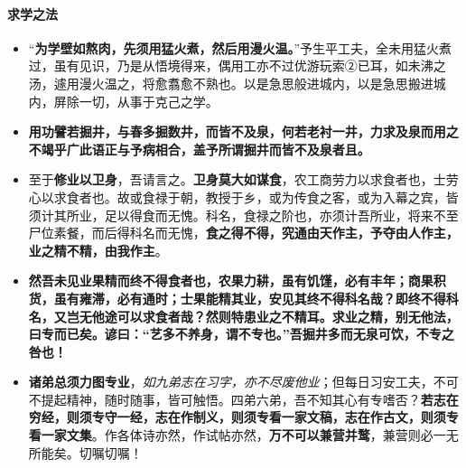 \documentclass[UTF8,a4paper,8pt]{ctexbook}
\begin{document}
	\paragraph{求学之法}
		\begin{itemize}
			\item “\textbf{为学壁如熬肉，先须用猛火煮，然后用漫火温。}”予生平工夫，全未用猛火煮过，虽有见识，乃是从悟境得来，偶用工亦不过优游玩索②已耳，如未沸之汤，遽用漫火温之，将愈翥愈不熟也。以是急思般进城内，以是急思搬进城内，屏除一切，从事于克己之学。
			
			\item \textbf{用功譬若掘井，与春多掘数井，而皆不及泉，何若老衬一井，力求及泉而用之不竭乎广此语正与予病相合，盖予所谓掘井而皆不及泉者且。}
			
			\item 至于\textbf{修业以卫身}，吾请言之。\textbf{卫身莫大如谋食}，农工商劳力以求食者也，士劳心以求食者也。故或食禄于朝，教授于乡，或为传食之客，或为入幕之宾，皆须计其所业，足以得食而无愧。科名，食禄之阶也，亦须计吾所业，将来不至尸位素餐，而后得科名而无愧，\textbf{食之得不得，究通由天作主，予夺由人作主，业之精不精，由我作主}。
			
			\item \textbf{然吾未见业果精而终不得食者也，农果力耕，虽有饥馑，必有丰年；商果积货，虽有雍滞，必有通时；士果能精其业，安见其终不得科名哉？即终不得科名，又岂无他途可以求食者哉？然则特患业之不精耳。求业之精，别无他法，曰专而已矣。谚曰：“艺多不养身，谓不专也。”吾掘井多而无泉可饮，不专之咎也！}
			
			\item \textbf{诸弟总须力图专业}，\textit{如九弟志在习字，亦不尽废他业}；但每日习安工夫，不可不提起精神，随时随事，皆可触悟。四弟六弟，吾不知其心有专嗜否？\textbf{若志在穷经，则须专守一经，志在作制义，则须专看一家文稿，志在作古文，则须专看一家文集}。作各体诗亦然，作试帖亦然，\textbf{万不可以兼营并鹜}，兼营则必一无所能矣。切嘱切嘱！
		\end{itemize}
	
\end{document}
